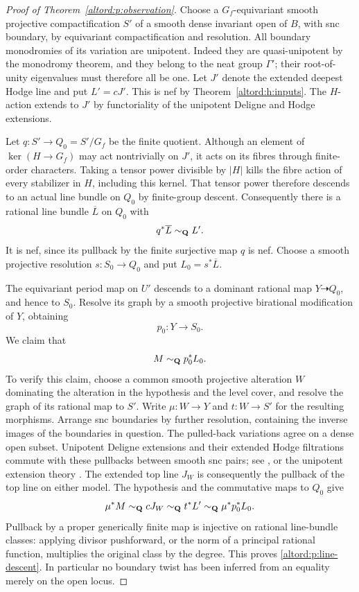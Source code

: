 \begin{proof}[Proof of Theorem~\ref{altord:p:observation}]
Choose a $G_f$-equivariant smooth projective compactification $S'$ of a
smooth dense invariant open of $B$, with snc boundary, by equivariant
compactification and resolution.  All boundary monodromies of its
variation are unipotent.  Indeed they are quasi-unipotent by the
monodromy theorem, and they belong to the neat group $\Gamma'$; their
root-of-unity eigenvalues must therefore all be one.  Let $J'$ denote
the extended deepest Hodge line and put $L'=cJ'$.  This is nef by
Theorem~\ref{altord:h:inputs}.  The $H$-action extends to $J'$ by
functoriality of the unipotent Deligne and Hodge extensions.

Let $q:S'\to Q_0=S'/G_f$ be the finite quotient.  Although an element
of $\ker(H\to G_f)$ may act nontrivially on $J'$, it acts on its fibres
through finite-order characters.  Taking a tensor power divisible by
$|H|$ kills the fibre action of every stabilizer in $H$, including this
kernel.  That tensor power therefore descends to an actual line bundle
on $Q_0$ by finite-group descent.  Consequently there is a rational
line bundle $\overline L$ on $Q_0$ with
\[
  q^*\overline L\sim_{\mathbf Q}L'.
\]
It is nef, since its pullback by the finite surjective map $q$ is nef.
Choose a smooth projective resolution $s:S_0\to Q_0$ and put
$L_0=s^*\overline L$.

The equivariant period map on $U'$ descends to a dominant rational map
$Y\dashrightarrow Q_0$, and hence to $S_0$.  Resolve its graph by a
smooth projective birational modification of $Y$, obtaining
\[
  p_0:Y\longrightarrow S_0.
\]
We claim that
\begin{equation}
  M\sim_{\mathbf Q}p_0^*L_0.
  \label{altord:p:line-descent}
\end{equation}
To verify this claim, choose a common smooth projective alteration $W$
dominating the alteration in the hypothesis and the level cover, and
resolve the graph of its rational map to $S'$.  Write
$\mu:W\to Y$ and $t:W\to S'$ for the resulting morphisms.  Arrange
snc boundaries by further resolution, containing the inverse images of
the boundaries in question.  The pulled-back variations agree on a
dense open subset.  Unipotent Deligne extensions and their extended
Hodge filtrations commute with these pullbacks between smooth snc
pairs; see \cite[Lemma~5.6]{BFMT}, or the unipotent extension theory
\cite{Schmid,CKS}.  The extended top line $J_W$ is consequently the
pullback of the top line on either model.  The hypothesis and the
commutative maps to $Q_0$ give
\[
  \mu^*M\sim_{\mathbf Q}cJ_W
  \sim_{\mathbf Q}t^*L'
  \sim_{\mathbf Q}\mu^*p_0^*L_0.
\]
Pullback by a proper generically finite map is injective on rational
line-bundle classes: applying divisor pushforward, or the norm of a
principal rational function, multiplies the original class by the
degree.  This proves \eqref{altord:p:line-descent}.  In particular no boundary
twist has been inferred from an equality merely on the open locus.


\end{proof}
